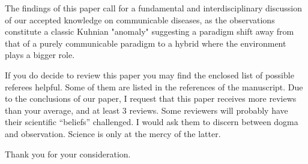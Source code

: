 \documentclass[11pt,a4paper,roman]{moderncv}
\begin{document}
The findings of this paper call for a fundamental and interdisciplinary discussion of our accepted knowledge on communicable diseases, as the observations constitute a classic Kuhnian "anomaly" suggesting a paradigm shift away from that of a purely communicable paradigm to a hybrid where the environment plays a bigger role.

If you do decide to review this paper you may find the enclosed list of possible referees helpful. Some of them are listed in the references of the manuscript. Due to the conclusions of our paper, I request that this paper receives more reviews than your average, and at least 3 reviews. Some reviewers will probably have their scientific ``beliefs'' challenged. I would ask them to discern between dogma and observation. Science is only at the mercy of the latter.

Thank you for your consideration.

\makeletterclosing
\newpage


\end{document}
